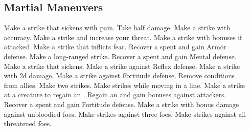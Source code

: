 \subsection{Martial Maneuvers}\label{Martial Maneuvers}
\begin{spelllist}
 Make a strike that sickens with pain.
 Take half damage.
 Make a strike with  accuracy.
 Make a strike and increase your threat.
 Make a strike with bonuses if attacked.
 Make a strike that inflicts fear.
 Recover a spent  and gain  Armor defense.
 Make a long-ranged strike.
 Recover a spent  and gain  Mental defense.
 Make a strike that sickens.
 Make a strike against Reflex defense.
 Make a strike with \plus2d damage.
 Make a strike against Fortitude defense.
 Remove conditions from allies.
 Make two strikes.
 Make strikes while moving in a line.
 Make a strike at a creature to regain an .
 Regain an  and gain bonuses against attackers.
 Recover a spent  and gain  Fortitude defense.
 Make a strike with bonus damage against unbloodied foes.
 Make strikes against three foes.
 Make strikes against all threatened foes.
\end{spelllist}



\small

